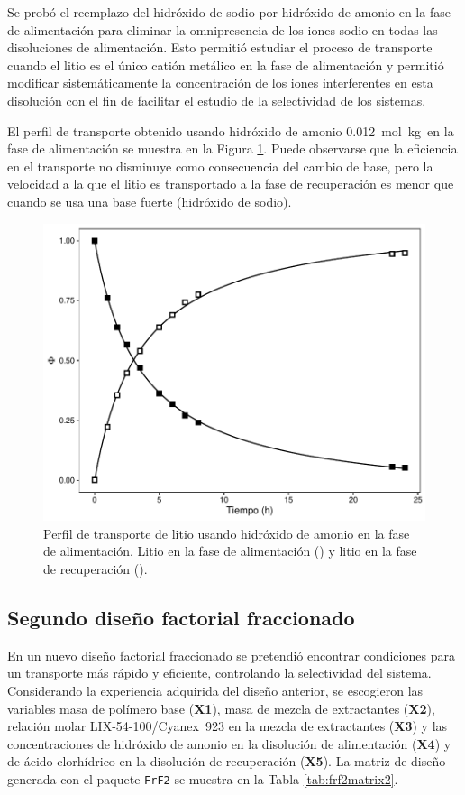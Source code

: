 Se probó el reemplazo del hidróxido de sodio por hidróxido de amonio en la fase de alimentación para eliminar la omnipresencia de los iones sodio en todas las disoluciones de alimentación. Esto permitió estudiar el proceso de transporte cuando el litio es el único catión metálico en la fase de alimentación y permitió modificar sistemáticamente la concentración de los iones interferentes en esta disolución con el fin de facilitar el estudio de la selectividad de los sistemas. 

El perfil de transporte obtenido usando hidróxido de amonio 0.012~mol~kg\mnn\ en la fase de alimentación se muestra en la Figura \ref{fig:amonio1}. Puede observarse que la eficiencia en el transporte no disminuye como consecuencia del cambio de base, pero la velocidad a la que el litio es transportado a la fase de recuperación es menor que cuando se usa una base fuerte (hidróxido de sodio).
\begin{figure}[H]
  \centering
  \includegraphics[height=0.388\textwidth]{chap5/figures/g1profile.pdf}
  \caption[Perfil de transporte de litio usando hidróxido de amonio en la fase de alimentación.]{Perfil de transporte de litio usando hidróxido de amonio en la fase de alimentación. Litio en la fase de alimentación (\protect\squareblck) y litio en la fase de recuperación (\protect\squarewht).}
  \label{fig:amonio1}
\end{figure}


\subsection{Segundo diseño factorial fraccionado}
En un nuevo diseño factorial fraccionado se pretendió encontrar condiciones para un transporte más rápido y eficiente, controlando la selectividad del sistema. Considerando la experiencia adquirida del diseño anterior, se escogieron las variables masa de polímero base (\textbf{X1}), masa de mezcla de extractantes (\textbf{X2}), relación molar LIX-54-100/Cyanex~923 en la mezcla de extractantes (\textbf{X3}) y las concentraciones de hidróxido de amonio en la disolución de alimentación (\textbf{X4}) y de ácido clorhídrico en la disolución de recuperación (\textbf{X5}). La matriz de diseño generada con el paquete \verb|FrF2| \citep{FrF2} se muestra en la Tabla \ref{tab:frf2matrix2}.

